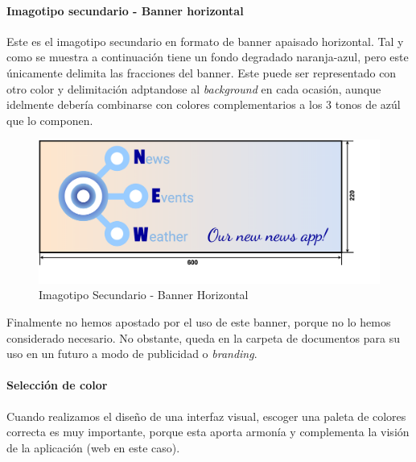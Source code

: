 \documentclass[../ei103948-project-documentation.tex]{subfiles}
\begin{document}
                    
                    
                            \paragraph*{Imagotipo secundario - Banner horizontal}
                            Este es el imagotipo secundario en formato de banner apaisado horizontal. Tal y como se muestra a continuación tiene un fondo degradado naranja-azul, pero este únicamente delimita las fracciones del banner. Este puede ser representado con otro color y delimitación adptandose al \textit{background} en cada ocasión, aunque idelmente debería combinarse con colores complementarios a los 3 tonos de azúl que lo componen.
                    
                    
                    
                            \begin{figure}[H]
                                \begin{center}
                                \includegraphics[scale=0.14]{images/LogoBanner.png}
                                \end{center}
                                \caption{Imagotipo Secundario - Banner Horizontal}
                            \end{figure}

                            Finalmente no hemos apostado por el uso de este banner, porque no lo hemos considerado necesario. No obstante, queda en la carpeta de documentos para su uso en un futuro a modo de publicidad o \textit{branding}.
                    
                            \paragraph{Selección de color}
                            Cuando realizamos el diseño de una interfaz visual, escoger una paleta de colores correcta es muy importante, porque esta aporta armonía y complementa la visión de la aplicación (web en este caso).\\
                            
\end{document}
